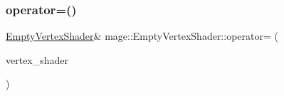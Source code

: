 \subsubsection{\texorpdfstring{operator=()}{operator=()}\hspace{0.1cm}{\footnotesize\ttfamily [2/2]}}
{\footnotesize\ttfamily \hyperlink{classmage_1_1_empty_vertex_shader}{Empty\+Vertex\+Shader}\& mage\+::\+Empty\+Vertex\+Shader\+::operator= (\begin{DoxyParamCaption}\item[{\hyperlink{classmage_1_1_empty_vertex_shader}{Empty\+Vertex\+Shader} \&\&}]{vertex\+\_\+shader }\end{DoxyParamCaption})\hspace{0.3cm}{\ttfamily [delete]}}

